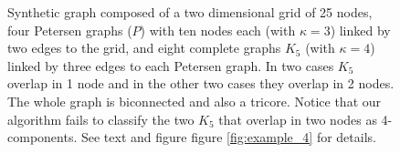 \begin{figure}[H]
\caption[Example synthetic graph for illustration.]{Synthetic graph composed of a two dimensional grid of 25 nodes, four Petersen graphs ($P$) with ten nodes each (with $\kappa = 3$) linked by two edges to the grid, and eight complete graphs $K_5$ (with $\kappa = 4$) linked by three edges to each Petersen graph. In two cases $K_5$ overlap in 1 node and in the other two cases they overlap in 2 nodes. The whole graph is biconnected and also a tricore. Notice that our algorithm fails to classify the two $K_5$ that overlap in two nodes as 4-components. See text and  figure figure  \ref{fig:example_4} for details.}
\label{fig:example}
\end{figure}


\begin{figure}[H]
\centering
{}
\hspace{.05in}
\end{figure}
